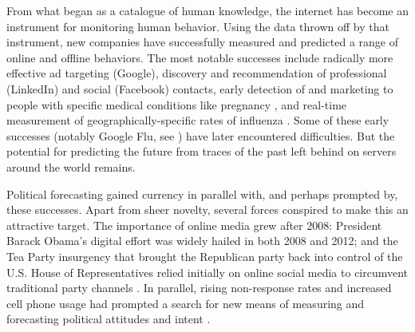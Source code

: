 \documentclass{article}
\begin{document}

From what began as a catalogue of human knowledge, the internet has
become an instrument for monitoring human behavior. Using the data
thrown off by that instrument, new companies have successfully
measured and predicted a range of online and offline behaviors. The
most notable successes include radically more effective ad targeting
(Google), discovery and recommendation of professional (LinkedIn) and
social (Facebook) contacts, early detection of and marketing to people
with specific medical conditions like pregnancy \citep{hill2012},
and real-time measurement of geographically-specific rates of influenza
\citep{ginsberg2008detecting}. Some of these early successes (notably Google
Flu, see \cite{butler2013google,41763}) have later encountered
difficulties. But the potential for predicting the future from 
traces of the past left behind on servers around the world remains.

Political forecasting gained currency in parallel with, and perhaps
prompted by, these successes. Apart from sheer novelty, several forces
conspired to make this an attractive target. The importance of online
media grew after 2008: President Barack Obama's digital effort was
widely hailed in both 2008 and 2012; and the Tea Party insurgency that
brought the Republican party back into control of the U.S. House of
Representatives relied initially on online social media to circumvent
traditional party channels \citep{williamson2011tea}. In parallel,
rising non-response rates and increased cell phone usage had prompted
a search for new means of measuring and forecasting political
attitudes and intent
\citep{keeter2006gauging,kohut2012assessing,christian2010assessing,boyle2013sampling,viera2013mail}.
\end{document}

